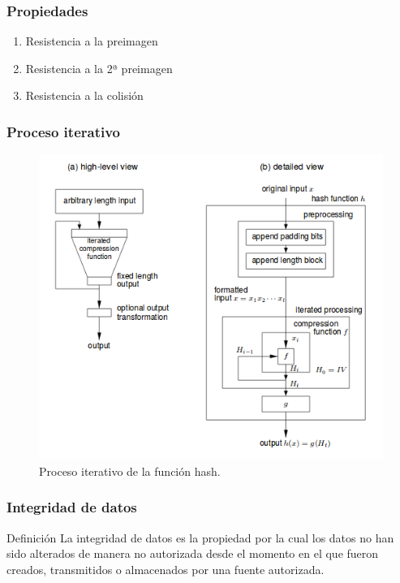 \documentclass{beamer}
\begin{document}

\begin{frame}
\frametitle{Propiedades}
\begin{enumerate}
\item {\LARGE Resistencia a la preimagen}
\item {\LARGE Resistencia a la 2ª preimagen}
\item {\LARGE Resistencia a la colisión}
\end{enumerate}
\end{frame}


\begin{frame}
\frametitle{Proceso iterativo}
\begin{figure}
\includegraphics[width=0.8\linewidth]{images/imagen_hashfunction.png}
\caption{Proceso iterativo de la función hash.}
\end{figure}
\end{frame}


\begin{frame}
\frametitle{Integridad de datos}
\begin{block}{Definición}
  La integridad de datos es la propiedad por la cual los datos no
  han sido alterados de manera no autorizada desde el momento en el que
  fueron creados, transmitidos o almacenados por una fuente autorizada.
\end{block}
\end{frame}
\end{document}
